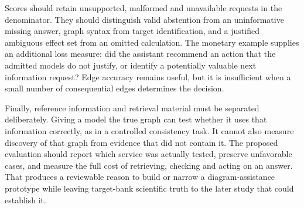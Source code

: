 Scores should retain unsupported, malformed and unavailable requests in
the denominator. They should distinguish valid abstention from an
uninformative missing answer, graph syntax from target identification,
and a justified ambiguous effect set from an omitted calculation. The
monetary example supplies an additional loss measure: did the assistant
recommend an action that the admitted models do not justify, or identify
a potentially valuable next information request? Edge accuracy remains
useful, but it is insufficient when a small number of consequential
edges determines the decision.

Finally, reference information and retrieval material must be separated
deliberately. Giving a model the true graph can test whether it uses
that information correctly, as in a controlled consistency task. It
cannot also measure discovery of that graph from evidence that did not
contain it. The proposed evaluation should report which service was
actually tested, preserve unfavorable cases, and measure the full cost
of retrieving, checking and acting on an answer. That produces a
reviewable reason to build or narrow a diagram-assistance prototype
while leaving target-bank scientific truth to the later study that could
establish it. \label{exec13:diagram-development-end}
